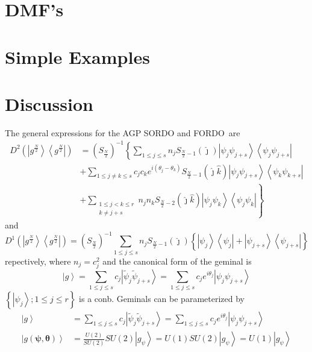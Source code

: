 \documentclass[aps,preprint]{revtex4}%
\begin{document}
\section{DMF's}

\section{Simple Examples}

\section{Discussion}

The general expressions for the AGP SORDO and FORDO\ are
\begin{align}
D^{2}\left(  \left\vert g^{\frac{N}{2}}\right\rangle \left\langle g^{\frac
{N}{2}}\right\vert \right)   &  =\left(  S_{\frac{N}{2}}\right)  ^{-1}\left\{
\sum_{1\leq j\leq s}n_{j}S_{\frac{N}{2}-1}\left(  \hat{\jmath}\right)
\left\vert \psi_{j}\psi_{j+s}\right\rangle \left\langle \psi_{j}\psi
_{j+s}\right\vert \right. \nonumber\\
&  +\sum_{1\leq j\neq k\leq s}c_{j}c_{k}e^{i\left(  \theta_{j}-\theta
_{k}\right)  }S_{\frac{N}{2}-1}\left(  \hat{\jmath}\hat{k}\right)  \left\vert
\psi_{j}\psi_{j+s}\right\rangle \left\langle \psi_{k}\psi_{k+s}\right\vert
\nonumber\\
&  \left.  +\sum_{\substack{1\leq j<k\leq r\\k\neq j+s}}n_{j}n_{k}S_{\frac
{N}{2}-2}\left(  \hat{\jmath}\hat{k}\right)  \left\vert \psi_{j}\psi
_{k}\right\rangle \left\langle \psi_{j}\psi_{k}\right\vert \right\}
\label{D2}%
\end{align}
and
\[
D^{1}\left(  \left\vert g^{\frac{N}{2}}\right\rangle \left\langle g^{\frac
{N}{2}}\right\vert \right)  =\left(  S_{\frac{N}{2}}\right)  ^{-1}\sum_{1\leq
j\leq s}n_{j}S_{\frac{N}{2}-1}\left(  \hat{\jmath}\right)  \left\{  \left\vert
\psi_{j}\right\rangle \left\langle \psi_{j}\right\vert +\left\vert \psi
_{j+s}\right\rangle \left\langle \psi_{j+s}\right\vert \right\}
\]
repectively, where $n_{j}=c_{j}^{2}$ and the canonical form of the geminal is
\[
\left\vert g\right\rangle =\sum_{1\leq j\leq s}c_{j}\left\vert \tilde{\psi
}_{j}\tilde{\psi}_{j+s}\right\rangle =\sum_{1\leq j\leq s}c_{j}e^{i\theta_{j}%
}\left\vert \psi_{j}\psi_{j+s}\right\rangle
\]
$\left\{  \left\vert \psi_{j}\right\rangle ;1\leq j\leq r\right\}  $ is a
conb. Geminals can be parameterized by
\begin{align*}
\left\vert g\right\rangle  &  =\sum_{1\leq j\leq s}c_{j}\left\vert \tilde
{\psi}_{j}\tilde{\psi}_{j+s}\right\rangle =\sum_{1\leq j\leq s}c_{j}%
e^{i\theta_{j}}\left\vert \psi_{j}\psi_{j+s}\right\rangle \\
\left\vert g\left(  \mathbf{\psi,\theta}\right)  \right\rangle  &
=\frac{U\left(  2\right)  }{SU\left(  2\right)  }SU\left(  2\right)
\left\vert g_{\psi}\right\rangle =U\left(  1\right)  SU\left(  2\right)
\left\vert g_{\psi}\right\rangle =U\left(  1\right)  \left\vert g_{\psi
}\right\rangle
\end{align*}
\end{document}
